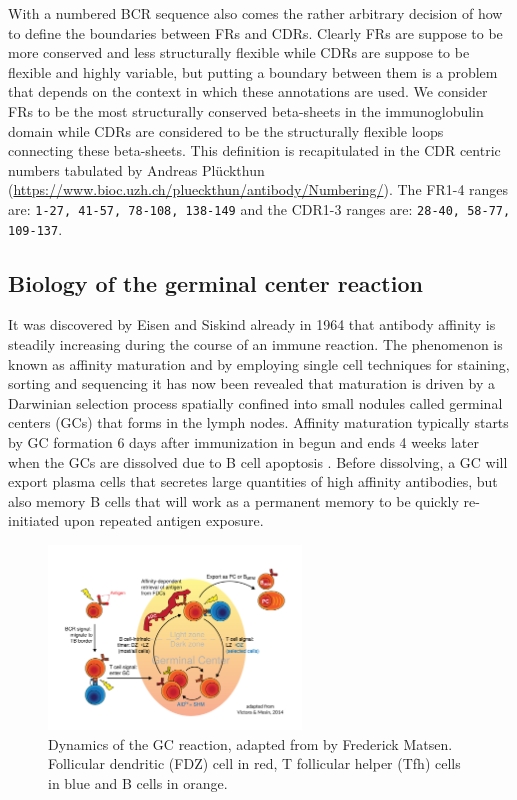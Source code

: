 With a numbered BCR sequence also comes the rather arbitrary decision of how to define the boundaries between FRs and CDRs.
Clearly FRs are suppose to be more conserved and less structurally flexible while CDRs are suppose to be flexible and highly variable, but putting a boundary between them is a problem that depends on the context in which these annotations are used.
We consider FRs to be the most structurally conserved beta-sheets in the immunoglobulin domain while CDRs are considered to be the structurally flexible loops connecting these beta-sheets.
This definition is recapitulated in the CDR centric numbers tabulated by Andreas Pl{\"u}ckthun (\url{https://www.bioc.uzh.ch/plueckthun/antibody/Numbering/}).
The FR1-4 ranges are: \texttt{1-27, 41-57, 78-108, 138-149} and the CDR1-3 ranges are: \texttt{28-40, 58-77, 109-137}.






\subsection{Biology of the germinal center reaction}
It was discovered by Eisen and Siskind already in 1964 \cite{eisen1964variations} that antibody affinity is steadily increasing during the course of an immune reaction.
The phenomenon is known as affinity maturation and by employing single cell techniques for staining, sorting and sequencing it has now been revealed that maturation is driven by a Darwinian selection process spatially confined into small nodules called germinal centers (GCs) that forms in the lymph nodes.
Affinity maturation typically starts by GC formation 6 days after immunization in begun and ends 4 weeks later when the GCs are dissolved due to B cell apoptosis \cite{victora2012germinal}.
Before dissolving, a GC will export plasma cells that secretes large quantities of high affinity antibodies, but also memory B cells that will work as a permanent memory to be quickly re-initiated upon repeated antigen exposure.

\begin{figure}[!ht]
    \centering
    \includegraphics[width=0.6\textwidth]{figures/GC_reaction.pdf}
    \caption{
        \label{fig:GC_reaction}
        Dynamics of the GC reaction, adapted from \cite{victora2014clonal} by Frederick Matsen.
        Follicular dendritic (FDZ) cell in red, T follicular helper (Tfh) cells in blue and B cells in orange.
    }
\end{figure}


